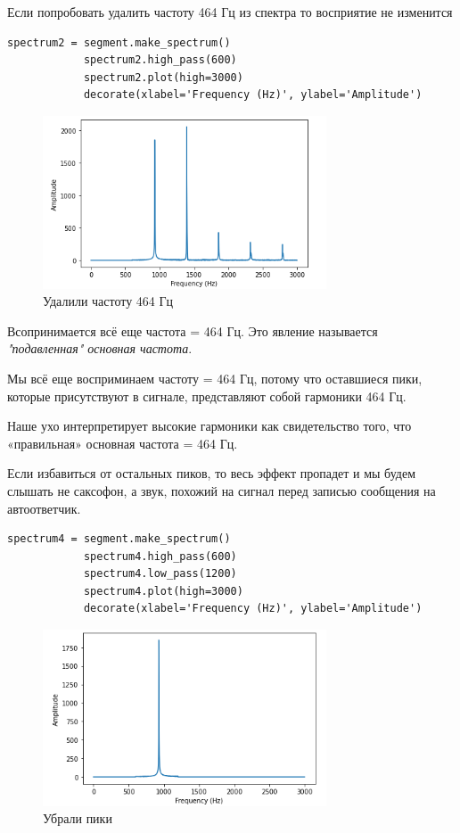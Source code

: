 \documentclass[a4paper,12pt]{article}
\begin{document}
\begin{enumerate}
		Если попробовать удалить частоту 464 Гц из спектра то восприятие не изменится
		\begin{lstlisting}[caption=Удалим частоту 464 Гц]
			spectrum2 = segment.make_spectrum()
			spectrum2.high_pass(600)
			spectrum2.plot(high=3000)
			decorate(xlabel='Frequency (Hz)', ylabel='Amplitude')
		\end{lstlisting}
		\begin{figure}[H]
			\centering
			\includegraphics[width=0.75\textwidth]{4_3.png}
			\caption{Удалили частоту 464 Гц}
			\label{fig:4.3}
		\end{figure}
		
		Всопринимается всё еще частота = 464 Гц. Это явление называется \textit{"подавленная" основная частота}.
		
		Мы всё еще восприминаем частоту = 464 Гц, потому что оставшиеся пики, которые присутствуют в сигнале, представляют собой гармоники 464 Гц.
		
		Наше ухо интерпретирует высокие гармоники как свидетельство того, что «правильная» основная частота = 464 Гц.
		
		Если избавиться от остальных пиков, то весь эффект пропадет и мы будем слышать не саксофон, а звук, похожий на сигнал перед записью сообщения на автоответчик.
		
		\begin{lstlisting}[caption=Убираем пики]
			spectrum4 = segment.make_spectrum()
			spectrum4.high_pass(600)
			spectrum4.low_pass(1200)
			spectrum4.plot(high=3000)
			decorate(xlabel='Frequency (Hz)', ylabel='Amplitude')
		\end{lstlisting}
		\begin{figure}[H]
			\centering
			\includegraphics[width=0.75\textwidth]{4_4.png}
			\caption{Убрали пики}
			\label{fig:4.3}
		\end{figure}
		
		
		
	\end{enumerate}
	\newpage
	
\end{document}
